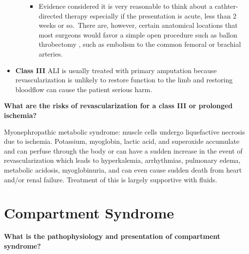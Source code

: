 \documentclass[
]{book}
\providecommand{\tightlist}{%
  \setlength{\itemsep}{0pt}\setlength{\parskip}{0pt}}
\begin{document}
\begin{itemize}
\begin{itemize}
    \begin{itemize}
    \tightlist
    \item
      Evidence considered it is very reasonable to think about a
      cathter-directed therapy especially if the presentation is
      acute, less than 2 weeks or so.~There are, however,
      certain anatomical locations that most surgeons would favor
      a simple open procedure such as ballon throbectomy , such as
      embolism to the common femoral or brachial arteries. ~~
    \end{itemize}
  \end{itemize}
\item
  \textbf{Class III} ALI is usually treated with primary amputation because
  revascularization is unlikely to restore function to the limb and
  restoring bloodflow can cause the patient serious harm.~
\end{itemize}

\textbf{What are the risks of revascularization for a class III or prolonged
ischemia?}

Myonephropathic metabolic syndrome: muscle cells undergo liquefactive necrosis
due to ischemia. Potassium, myoglobin, lactic acid, and superoxide accumulate
and can perfuse through the body or can have a sudden increase in the event of
revascularization which leads to hyperkalemia, arrhythmias, pulmonary edema,
metabolic acidosis, myoglobinuria, and can even cause sudden death from heart
and/or renal failure. \citep{obaraAcuteLimbIschemia2018} Treatment of this is largely
supportive with fluids.

\hypertarget{compartment-syndrome}{%
\section{Compartment Syndrome}\label{compartment-syndrome}}

\textbf{What is the pathophysiology and presentation of compartment
syndrome?}
\end{document}

